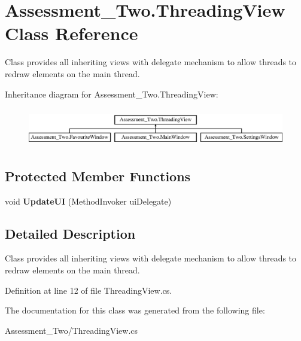\hypertarget{class_assessment___two_1_1_threading_view}{
\section{Assessment\_\-Two.ThreadingView Class Reference}
\label{class_assessment___two_1_1_threading_view}
}


Class provides all inheriting views with delegate mechanism to allow threads to redraw elements on the main thread.  


Inheritance diagram for Assessment\_\-Two.ThreadingView:\begin{figure}[H]
\begin{center}
\leavevmode
\includegraphics[height=1.712538cm]{class_assessment___two_1_1_threading_view}
\end{center}
\end{figure}
\subsection*{Protected Member Functions}
\begin{DoxyCompactItemize}
\item 
\hypertarget{class_assessment___two_1_1_threading_view_a7ba557ec054c73fe08a23ea722950b1f}{
void {\bfseries UpdateUI} (MethodInvoker uiDelegate)}
\label{class_assessment___two_1_1_threading_view_a7ba557ec054c73fe08a23ea722950b1f}

\end{DoxyCompactItemize}


\subsection{Detailed Description}
Class provides all inheriting views with delegate mechanism to allow threads to redraw elements on the main thread. 

Definition at line 12 of file ThreadingView.cs.



The documentation for this class was generated from the following file:\begin{DoxyCompactItemize}
\item 
Assessment\_\-Two/ThreadingView.cs\end{DoxyCompactItemize}
